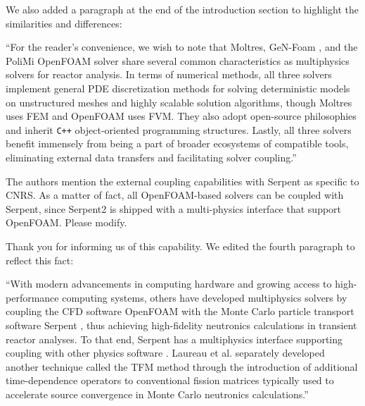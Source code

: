 \documentclass[answers,12pt]{exam}
\begin{document}
\begin{questions}
\begin{solution}
            We also added a paragraph at the end of the introduction section to
            highlight the similarities and differences:
            
            ``For the reader's convenience, we wish to note that Moltres, GeN-Foam
\cite{fiorina_gen-foam_2015}, and the PoliMi OpenFOAM solver
\cite{aufiero_development_2014} share several common characteristics as
multiphysics solvers for reactor analysis. In terms of numerical methods, all
three solvers implement general \gls{PDE} discretization methods for solving
deterministic models on unstructured meshes and highly scalable solution
algorithms, though Moltres uses \gls{FEM} and OpenFOAM uses \gls{FVM}. They
also adopt open-source philosophies and inherit \texttt{C++}
object-oriented programming structures. Lastly, all
three solvers benefit immensely from being a part of broader ecosystems of
compatible tools, eliminating external data
transfers and facilitating solver coupling.''
        \end{solution}

        \question The authors mention the external coupling capabilities with
        Serpent as specific to CNRS. As a matter of fact, all OpenFOAM-based
        solvers can be coupled with Serpent, since Serpent2 is shipped with a
        multi-physics interface that support OpenFOAM. Please modify.
        \begin{solution}
        	Thank you for informing us of this capability. We edited the fourth
        	paragraph to reflect this fact:
        	
        	``With modern advancements in computing hardware and growing access to
high-performance computing systems, others have developed multiphysics solvers
by coupling the \gls{CFD} software OpenFOAM
\cite{the_openfoam_foundation_ltd_openfoam_2021} with the Monte Carlo particle
transport software
Serpent \cite{leppanen_serpent_2014}, thus achieving high-fidelity neutronics
calculations in transient reactor analyses.
To that end, Serpent has a multiphysics interface supporting coupling
with other physics software \cite{leppanen_development_2013}.
Laureau et al. \cite{laureau_transient_2017}
separately developed another technique called the
\gls{TFM} method through the introduction of additional time-dependence
operators to conventional fission matrices typically used to accelerate source
convergence in Monte Carlo neutronics calculations.''
        \end{solution}


\end{questions}
\end{document}
